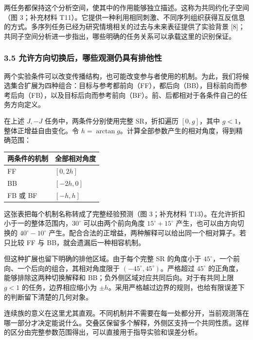 \documentclass[11pt,a4paper]{article}
\begin{document}
两任务都保持这个分析空间，使其中的作用能够独立描述。这称为共同约化子空间（图
3；补充材料
T11）。它提供一种利用相同刺激、不同序列组织获得互反信息的方式。多序列任务已经为研究情境相关的过去与未来表征提供了实验背景
{[}8{]}；共同子空间分析进一步指出，哪些明确的任务关系可以承载这里的识别保证。

\subsubsection{3.5
允许方向切换后，哪些观测仍具有排他性}\label{ux5141ux8bb8ux65b9ux5411ux5207ux6362ux540eux54eaux4e9bux89c2ux6d4bux4ecdux5177ux6709ux6392ux4ed6ux6027}

两个实验条件可以改变传播结构，也可能改变参与者使用的机制。为此，我们将候选集合扩展为四种组合：目标与参考都前向（FF），都后向（BB），目标前向而参考后向（FB），以及目标后向而参考前向（BF）。前、后都相对于各条件自己的任务方向定义。

在上述 \(J,-J\) 任务中，两条件分别使用完整 SR，折扣遍历 \([0,g]\)，其中
\(g<1\)，整体正增益自由变化。令
\(h=\arctan g\)。计算全部参数产生的相对角度，得到精确范围：

\begin{longtable}[]{@{}ll@{}}
\toprule\noalign{}
两条件的机制 & 全部相对角度 \\
\midrule\noalign{}
\endhead
\bottomrule\noalign{}
\endlastfoot
FF & \([0,2h]\) \\
BB & \([-2h,0]\) \\
FB 或 BF & \([-h,h]\) \\
\end{longtable}

这张表把每个机制名称转成了完整经验预测（图 3；补充材料
T13）。在允许折扣小于一的整体范围内，\(30^\circ\) 可以由两个前向角度
\(15^\circ+15^\circ\) 产生，也可以由方向切换的 \(40^\circ-10^\circ\)
产生。配合合法的正增益，两种解释可以给出同一个相对算子。若只比较 FF 与
BB，就会遗漏后一种相容机制。

但这种扩展也留下明确的排他区域。由于每个完整 SR 的角度小于
\(45^\circ\)，一个前向、一个后向的组合，其相对角度限于
\((-45^\circ,45^\circ)\)。严格超过 \(45^\circ\)
的正角度，能够排除这两种切换解释和
BB；负外侧区域对应共同后向。对于有共同上限 \(g<1\)
的任务，边界相应缩小为
\(\pm h\)。采用严格越过边界的规则，也给有限误差下的判断留下清楚的几何对象。

连续族的意义在这里尤其直观。不同机制并不需要在每一处都分开，当前观测落在哪一部分才决定能说什么。交叠区保留多个解释，外侧区支持一个共同性质。这样的区分由完整参数范围得出，可以直接用于指导实验和误差分析。
\end{document}

